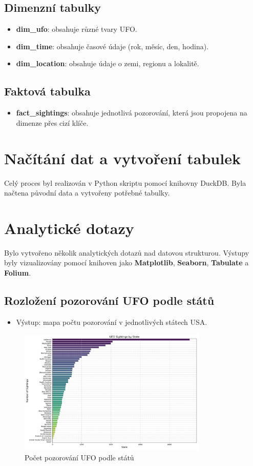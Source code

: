 \documentclass[a4paper,12pt]{article}
\begin{document}
\subsection{Dimenzní tabulky}
\begin{itemize}
    \item \textbf{dim\_ufo}: obsahuje různé tvary UFO.
    \item \textbf{dim\_time}: obsahuje časové údaje (rok, měsíc, den, hodina).
    \item \textbf{dim\_location}: obsahuje údaje o zemi, regionu a lokalitě.
\end{itemize}

\subsection{Faktová tabulka}
\begin{itemize}
    \item \textbf{fact\_sightings}: obsahuje jednotlivá pozorování, která jsou propojena na dimenze přes cizí klíče.
\end{itemize}

\section{Načítání dat a vytvoření tabulek}
Celý proces byl realizován v Python skriptu pomocí knihovny DuckDB. Byla načtena původní data a vytvořeny potřebné tabulky.

\section{Analytické dotazy}
Bylo vytvořeno několik analytických dotazů nad datovou strukturou. Výstupy byly vizualizovány pomocí knihoven jako \textbf{Matplotlib}, \textbf{Seaborn}, \textbf{Tabulate} a \textbf{Folium}.

\subsection{Rozložení pozorování UFO podle států}
\begin{itemize}
    \item Výstup: mapa počtu pozorování v jednotlivých státech USA.
\end{itemize}

\begin{figure}[h]
\centering
\includegraphics[width=0.8\textwidth]{../images/ufo_sightings_by_state.png}
\caption{Počet pozorování UFO podle států}
\end{figure}
\end{document}
